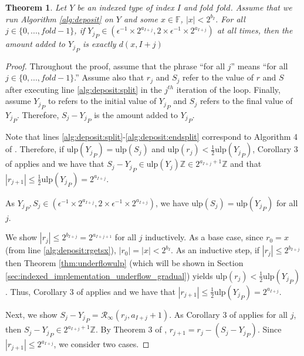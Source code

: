 \documentclass[12pt]{article}
\providecommand{\F}{\ensuremath{\mathbb{F}}}
\providecommand{\Z}{\ensuremath{\mathbb{Z}}}
\providecommand{\ulp}{\ensuremath{\text{ulp}}}
\providecommand{\roundtonearestinfty}{\ensuremath{\mathcal{R}_\text{$\infty$}}}
\theoremstyle{plain}
\newtheorem{thm}{Theorem}[section]
\numberwithin{equation}{section}
\begin{document}
      \begin{thm}
        Let $Y$ be an indexed type of index $I$ and fold $fold$. Assume that we run Algorithm \ref{alg:deposit} on $Y$ and some $x \in \F$, $|x| < 2^{b_I}$. For all $j \in \{0, ..., fold - 1\}$, if ${Y_j}_P \in (\epsilon^{-1} \times 2^{a_{I + j}}, 2 \times \epsilon^{-1} \times 2^{a_{I + j}})$ at all times, then the amount added to ${Y_j}_P$ is exactly $d(x, I + j)$
        \label{thm:ddeposit}
      \end{thm}
      \begin{proof}
        Throughout the proof, assume that the phrase ``for all $j$'' means ``for all $j \in \{0, ..., fold - 1\}$.'' Assume also that $r_j$ and $S_j$ refer to the value of $r$ and $S$ after executing line \ref{alg:deposit:split} in the $j^{th}$ iteration of the loop. Finally, assume ${Y_j}_P$ to refers to the initial value of ${Y_j}_P$ and $S_j$ refers to the final value of ${Y_j}_P$. Therefore, $S_j - {Y_j}_P$ is the amount added to ${Y_j}_P$.

        Note that lines \ref{alg:deposit:split}-\ref{alg:deposit:endsplit} correspond to Algorithm 4 of \cite{repsum}.
        Therefore, if $\ulp({Y_j}_P) = \ulp(S_j)$ and $\ulp(r_j) < \frac{1}{2}\ulp({Y_j}_P)$, Corollary 3 of \cite{repsum} applies and we have that $S_j - {Y_j}_P \in \ulp({Y_j})\Z \in 2^{a_{I + j} + 1}\Z$ and that $|r_{j + 1}| \leq \frac{1}{2}\ulp({Y_j}_P) = 2^{a_{I + j}}$.

        As ${Y_j}_P, S_j \in (\epsilon^{-1} \times 2^{a_{I + j}}, 2 \times \epsilon^{-1} \times 2^{a_{I + j}})$, we have $\ulp(S_j) = \ulp({Y_j}_P)$ for all $j$.

        We show $|r_j| \leq 2^{b_{I + j}} = 2^{a_{I + j + 1}}$ for all $j$ inductively. As a base case, since $r_0 = x$ (from line \ref{alg:deposit:rgetsx}), $|r_0| = |x| < 2^{b_{I}}$.
        As an inductive step, if $|r_j| \leq 2^{b_{I + j}}$ then Theorem \ref{thm:underflowulp} (which will be shown in Section \ref{sec:indexed_implementation_underflow_gradual}) yields $\ulp(r_j) < \frac{1}{2}\ulp({Y_j}_P)$. Thus, Corollary 3 of \cite{repsum} applies and we have that $|r_{j + 1}| \leq \frac{1}{2}\ulp({Y_j}_P) = 2^{a_{I + j}}$.

        Next, we show $S_j - {Y_j}_P = \roundtonearestinfty(r_j, a_{I + j} + 1)$. As Corollary 3 of \cite{repsum} applies for all $j$, then $S_j - {Y_j}_P \in 2^{a_{I + j} + 1}\Z$. By Theorem 3 of \cite{repsum}, $r_{j + 1} = r_j - (S_j - {Y_j}_P)$. Since $|r_{j + 1}| \leq 2^{a_{I + j}}$, we consider two cases.


\end{proof}
\end{document}
